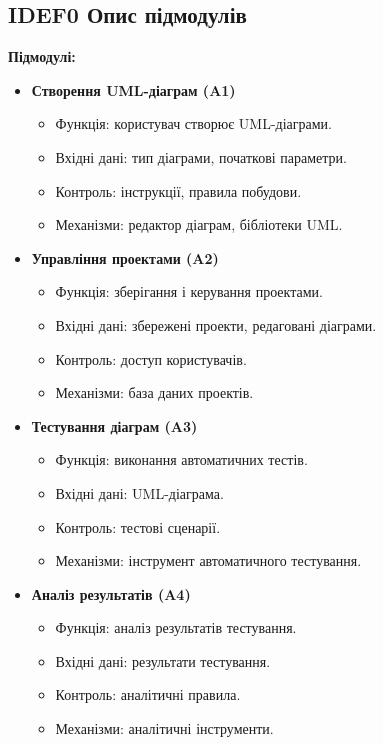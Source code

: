 \documentclass[oneside,14pt]{extarticle}
\begin{document}
\begin{normalsize}
    \subsection*{IDEF0 Опис підмодулів}
    \textbf{Підмодулі:}
    \begin{itemize}
    	\item \textbf{Створення UML-діаграм (A1)}
    	\begin{itemize}
    		\item Функція: користувач створює UML-діаграми.
    		\item Вхідні дані: тип діаграми, початкові параметри.
    		\item Контроль: інструкції, правила побудови.
    		\item Механізми: редактор діаграм, бібліотеки UML.
    	\end{itemize}
    	\item \textbf{Управління проектами (A2)}
    	\begin{itemize}
    		\item Функція: зберігання і керування проектами.
    		\item Вхідні дані: збережені проекти, редаговані діаграми.
    		\item Контроль: доступ користувачів.
    		\item Механізми: база даних проектів.
    	\end{itemize}
    	\item \textbf{Тестування діаграм (A3)}
    	\begin{itemize}
    		\item Функція: виконання автоматичних тестів.
    		\item Вхідні дані: UML-діаграма.
    		\item Контроль: тестові сценарії.
    		\item Механізми: інструмент автоматичного тестування.
    	\end{itemize}
    	\item \textbf{Аналіз результатів (A4)}
    	\begin{itemize}
    		\item Функція: аналіз результатів тестування.
    		\item Вхідні дані: результати тестування.
    		\item Контроль: аналітичні правила.
    		\item Механізми: аналітичні інструменти.
    	\end{itemize}
    \end{itemize}
    

\end{normalsize}
\end{document}
